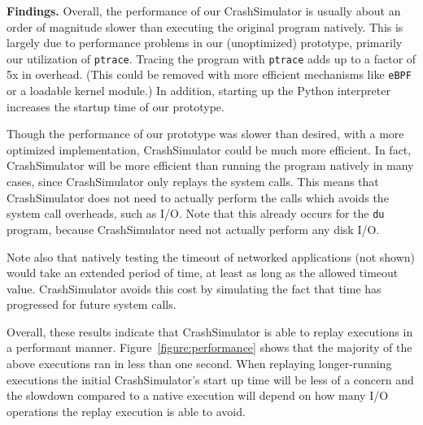 {\bf Findings.}
Overall, the performance of our CrashSimulator is usually about an order of
magnitude slower than executing the original program natively.  This is 
largely due to performance problems in our (unoptimized) prototype, 
primarily our utilization of {\tt ptrace}.  Tracing the program
with {\tt ptrace} adds up to a factor of 5x in overhead.  (This could
be removed with more efficient mechanisms like {\tt eBPF} or a loadable 
kernel module.)  In addition, starting up the Python interpreter increases the
startup time of our prototype.

Though the performance of our prototype was slower than desired,
with a more optimized implementation, CrashSimulator could be much more 
efficient.
In fact, CrashSimulator will be more efficient than 
running the program natively in many cases, since CrashSimulator only
replays the system calls. This means that CrashSimulator does not need to
actually perform the calls which avoids the system call overheads, such as 
I/O.  Note that this already occurs for the {\tt du} program, because 
CrashSimulator need not actually perform any disk I/O.

Note also that natively testing the timeout of networked applications (not
shown) would take an extended period of time, at least as long as the allowed
timeout value.  CrashSimulator avoids this cost by simulating the fact that
time has progressed for future system calls.

Overall, these results indicate that CrashSimulator is able to replay executions
in a performant manner.  Figure~\ref{figure:performance} shows that the majority
of the above executions ran in less than
one second.  When replaying longer-running executions the initial
CrashSimulator's start up time will be less of a concern and the slowdown
compared to a native execution will depend on how many I/O operations the replay
execution is able to avoid. 
